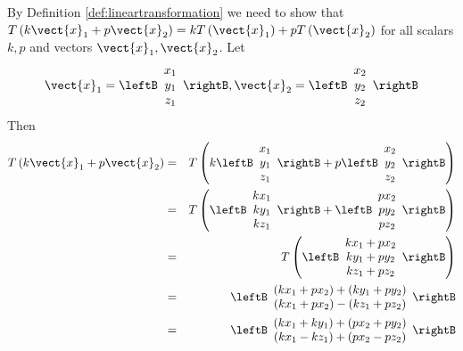 \begin{solution}
By Definition \ref{def:lineartransformation} we need to show that $T\left( k \vect{x}_1 + p \vect{x}_2 \right) = kT\left(\vect{x}_1\right)+ pT\left(\vect{x}_{2} \right)$ for all scalars $k,p$ and vectors $\vect{x}_1, \vect{x}_2$.
Let
\[
\vect{x}_1 = \leftB\begin{array}{c} x_1 \\ y_1 \\ z_1 \end{array}\rightB, 
\vect{x}_2 = \leftB\begin{array}{c} x_2 \\ y_2 \\ z_2 \end{array}\rightB
\]
Then
\begin{eqnarray*}
T\left( k \vect{x}_1 + p \vect{x}_2 \right) &=& T \left( k \leftB\begin{array}{c} x_1 \\ y_1 \\ z_1 \end{array}\rightB + p \leftB\begin{array}{c} x_2 \\ y_2 \\ z_2 \end{array}\rightB \right) \\
&=& T \left(  \leftB\begin{array}{c} kx_1 \\ ky_1 \\ kz_1 \end{array}\rightB +  \leftB\begin{array}{c} px_2 \\ py_2 \\ pz_2 \end{array}\rightB \right) \\
&=& T \left(  \leftB\begin{array}{c} kx_1 + px_2 \\ ky_1 + py_2 \\ kz_1 + pz_2 \end{array}\rightB  \right) \\
&=& \leftB\begin{array}{c} (kx_1 + px_2) + (ky_1 + py_2) \\ (kx_1 + px_2)- (kz_1 + pz_2) \end{array}\rightB \\
&=& \leftB\begin{array}{c} (kx_1 + ky_1) + (px_2 + py_2) \\ (kx_1 - kz_1) + (px_2 - pz_2) \end{array}\rightB \\

\end{eqnarray*}
\end{solution}
